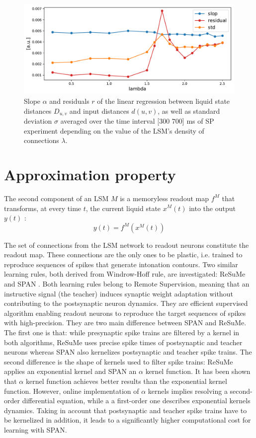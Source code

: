 \documentclass[11pt, a4paper]{article} %
\begin{document}
\begin{figure}
\centering
\includegraphics[scale=.7]{figures/SP_lambda.pdf}
\caption{Slope $\alpha$ and residuals $r$ of the linear regression between liquid state distances $D_{u,v}$ and input distances $d(u,v)$, as well as standard deviation $\sigma$ averaged over the time interval [300 700] ms of SP experiment depending on the value of the LSM's density of connections $\lambda$.}
\label{SPlambda}
\end{figure}

\section{Approximation property}

The second component of an LSM $M$ is a memoryless readout map $f^M$ that transforms, at every time $t$, the current liquid state $x^M(t)$ into the output $y(t)$ \cite{maass2002real}: \begin{equation}
y(t) = f^M(x^M(t))
\end{equation}

The set of connections from the LSM network to readout neurons constitute the readout map. These connections are the only ones to be plastic, i.e. trained to reproduce sequences of spikes that generate intonation contours. Two similar learning rules, both derived from Windrow-Hoff rule, are investigated: ReSuMe \cite{ponulak2006supervised, ponulak2010supervised} and SPAN \cite{mohemmed2012span, mohemmed2013training}. Both learning rules belong to Remote Supervision, meaning that an instructive signal (the teacher) induces synaptic weight adaptation without contributing to the postsynaptic neuron dynamics. They are efficient supervised algorithm enabling readout neurons to reproduce the target sequences of spikes with high-precision. They are two main difference between SPAN and ReSuMe. The first one is that: while presynaptic spike trains are filtered by a kernel in both algorithms, ReSuMe uses precise spike times of postsynaptic and teacher neurons whereas SPAN also kernelizes postsynaptic and teacher spike trains. The second difference is the shape of kernels used to filter spike trains: ReSuMe applies an exponential kernel and SPAN an $\alpha$ kernel function. It has been shown that $\alpha$ kernel  function achieves better results than the exponential kernel function. However, online implementation of $\alpha$ kernels implies resolving a second-order differential equation, while a a first-order one describes exponential kernels dynamics. Taking in account that postsynaptic and teacher spike trains have to be kernelized in addition, it leads to a significantly higher computational cost for learning with SPAN.
\end{document}
